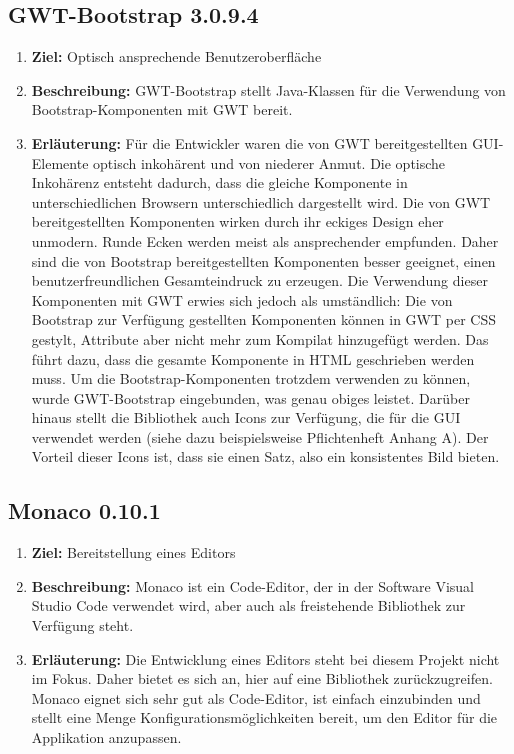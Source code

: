 \documentclass[parskip=full,11pt]{scrartcl}
\begin{document}
\subsection{GWT-Bootstrap 3.0.9.4}
\begin{enumerate}
\item[] \textbf{Ziel:} Optisch ansprechende Benutzeroberfläche
\item[] \textbf{Beschreibung:} GWT-Bootstrap stellt Java-Klassen für die Verwendung von Bootstrap-Komponenten mit GWT bereit.
\item[] \textbf{Erläuterung:} Für die Entwickler waren die von GWT bereitgestellten GUI-Elemente optisch inkohärent und von niederer Anmut.
Die optische Inkohärenz entsteht dadurch, dass die gleiche Komponente in unterschiedlichen Browsern unterschiedlich dargestellt wird.
Die von GWT bereitgestellten Komponenten wirken durch ihr eckiges Design eher unmodern.
Runde Ecken werden meist als ansprechender empfunden.
Daher sind die von Bootstrap bereitgestellten Komponenten besser geeignet, einen benutzerfreundlichen Gesamteindruck zu erzeugen.
Die Verwendung dieser Komponenten mit GWT erwies sich jedoch als umständlich:
Die von Bootstrap zur Verfügung gestellten Komponenten können in GWT per CSS gestylt, Attribute aber nicht mehr zum Kompilat hinzugefügt
werden. Das führt dazu, dass die gesamte Komponente in HTML geschrieben werden muss.
Um die Bootstrap-Komponenten trotzdem verwenden zu können, wurde GWT-Bootstrap eingebunden, was genau obiges leistet.
Darüber hinaus stellt die Bibliothek auch Icons zur Verfügung, die für die GUI verwendet werden (siehe dazu beispielsweise Pflichtenheft Anhang A).
Der Vorteil dieser Icons ist, dass sie einen Satz, also ein konsistentes Bild bieten.
\end{enumerate}

\subsection{Monaco 0.10.1}
\begin{enumerate}
\item[] \textbf{Ziel:} Bereitstellung eines Editors
\item[] \textbf{Beschreibung:} Monaco ist ein Code-Editor, der in der Software Visual Studio Code verwendet wird, aber auch als freistehende
Bibliothek zur Verfügung steht.
\item[] \textbf{Erläuterung:} Die Entwicklung eines Editors steht bei diesem Projekt nicht im Fokus.  Daher bietet es sich an, hier auf eine Bibliothek zurückzugreifen.
Monaco eignet sich sehr gut als Code-Editor, ist einfach einzubinden und stellt
 eine Menge Konfigurationsmöglichkeiten bereit, um den Editor für die Applikation anzupassen.
\end{enumerate}
\end{document}
